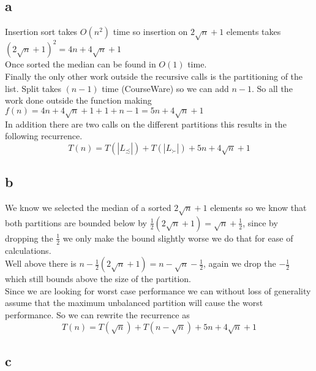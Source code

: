 \documentclass{article}
\begin{document}
    \subsection{a}
    Insertion sort takes $O(n^{2})$ time so insertion on $2\sqrt{n} + 1$ elements takes ${(2\sqrt{n} + 1)}^{2} = 4n + 4\sqrt{n} + 1$ \\
    Once sorted the median can be found in $O(1)$ time. \\
    Finally the only other work outside the recursive calls is the partitioning of the list. Split takes $(n - 1)$ time (CourseWare) so we can add $n - 1$.
    So all the work done outside the function making $f(n) = 4n + 4\sqrt{n} + 1 + 1 + n - 1 = 5n + 4\sqrt{n} + 1$ \\
    In addition there are two calls on the different partitions this results in the following recurrence.
    \[ T(n) = T(|L_{\precsim}|) + T(|L_{\succ}|) + 5n + 4\sqrt{n} + 1\]

    \subsection{b}
    We know we selected the median of a sorted $2\sqrt{n} + 1$ elements so we know that both partitions are bounded below  by
    $\frac{1}{2}(2\sqrt{n} + 1) = \sqrt{n} + \frac{1}{2}$, since by dropping the $\frac{1}{2}$ we only make the bound slightly worse we do that for ease of calculations. \\
    Well above there is $n - \frac{1}{2}(2\sqrt{n} + 1) = n -\sqrt{n} - \frac{1}{2}$, again we drop the $-\frac{1}{2}$ which still bounds above the size of the partition. \\
    Since we are looking for worst case performance we can without loss of generality assume that the maximum unbalanced partition will cause the worst performance. So we can rewrite the recurrence as
    \[ T(n) = T(\sqrt{n}) + T(n - \sqrt{n}) + 5n + 4\sqrt{n} + 1\]

    \subsection{c}
\end{document}
